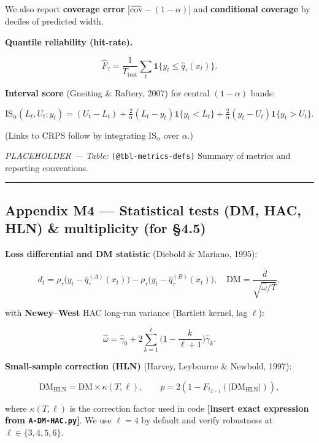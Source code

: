 \documentclass[
  a4paper,
  DIV=11,
  numbers=noendperiod]{scrreprt}
\begin{document}
We also report \textbf{coverage error}
\(|\widehat{\mathrm{cov}}-(1-\alpha)|\) and \textbf{conditional
coverage} by deciles of predicted width.

\textbf{Quantile reliability (hit-rate).}

\[
\label{eq-reliability}
\widehat F_\tau=\frac{1}{T_{\text{test}}}\sum_t \mathbf{1}\{y_t\le \widehat q_\tau(x_t)\}.
\]

\textbf{Interval score} (Gneiting \& Raftery, 2007) for central
\((1-\alpha)\) bands:

\[
\label{eq-interval-score}
\mathrm{IS}_\alpha(L_t,U_t;y_t)=(U_t-L_t) + \tfrac{2}{\alpha}(L_t-y_t)\mathbf{1}\{y_t<L_t\}
+ \tfrac{2}{\alpha}(y_t-U_t)\mathbf{1}\{y_t>U_t\}.
\]

(Links to CRPS follow by integrating \(\mathrm{IS}_\alpha\) over
\(\alpha\).)

\emph{PLACEHOLDER --- Table:} \texttt{(@tbl-metrics-defs)} Summary of
metrics and reporting conventions.

\begin{center}\rule{0.5\linewidth}{0.5pt}\end{center}

\subsection{Appendix M4 --- Statistical tests (DM, HAC, HLN) \&
multiplicity (for §4.5)}\label{app-m4-tests}

\textbf{Loss differential and DM statistic} (Diebold \& Mariano, 1995):

\[
\label{eq-dm}
d_t=\rho_\tau\!\big(y_t-\widehat q_\tau^{(A)}(x_t)\big)-\rho_\tau\!\big(y_t-\widehat q_\tau^{(B)}(x_t)\big),\quad
\mathrm{DM}=\frac{\bar d}{\sqrt{\widehat\omega/T}},
\]

with \textbf{Newey--West} HAC long-run variance (Bartlett kernel, lag
\(\ell\)):

\[
\label{eq-nw}
\widehat\omega=\widehat\gamma_0+2\sum_{k=1}^{\ell}\!\Big(1-\frac{k}{\ell+1}\Big)\widehat\gamma_k.
\]

\textbf{Small-sample correction (HLN)} (Harvey, Leybourne \& Newbold,
1997):

\[
\label{eq-hln}
\mathrm{DM}_{\text{HLN}}=\mathrm{DM}\times \kappa(T,\ell),\qquad
p=2\!\left(1-F_{t_{T-1}}(|\mathrm{DM}_{\text{HLN}}|)\right),
\]

where \(\kappa(T,\ell)\) is the correction factor used in code
\textbf{{[}insert exact expression from \texttt{A-DM-HAC.py}{]}}. We use
\(\ell=4\) by default and verify robustness at \(\ell\in\{3,4,5,6\}\).
\end{document}
